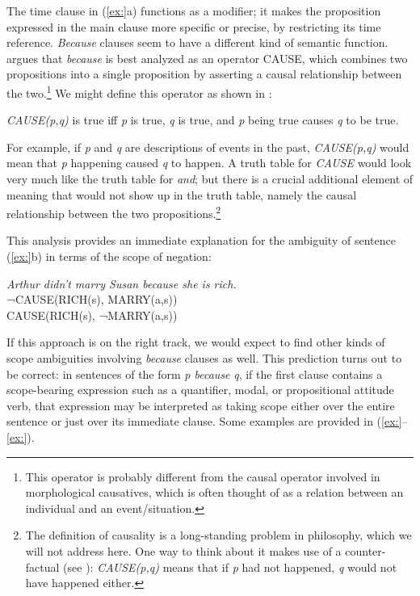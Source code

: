 The time clause in (\ref{ex:}a) functions as a modifier; it makes the proposition expressed in the main clause more specific or precise, by restricting its time reference. \textit{Because} clauses seem to have a different kind of semantic function. \citet{Johnston1994} argues that \textit{because} is best analyzed as an operator CAUSE, which combines two propositions into a single proposition by asserting a causal relationship between the two.\footnote{This operator is probably different from the causal operator involved in morphological causatives, which is often thought of as a relation between an individual and an event/situation.} We might define this operator as shown in :


\begin{stylepoints}
\textit{CAUSE(p,q)} is true iff \textit{p} is true, \textit{q} is true, and \textit{p} being true causes \textit{q} to be true.
\end{stylepoints}


For example, if \textit{p} and \textit{q} are descriptions of events in the past, \textit{CAUSE(p,q)} would mean that \textit{p} happening caused \textit{q} to happen. A truth table for \textit{CAUSE} would look very much like the truth table for \textit{and}; but there is a crucial additional element of meaning that would not show up in the truth table, namely the causal relationship between the two propositions.\footnote{The definition of causality is a long-standing problem in philosophy, which we will not address here. One way to think about it makes use of a counter-factual (see ): \textit{CAUSE(p,q)} means that if \textit{p} had not happened, \textit{q} would not have happened either.}



This analysis provides an immediate explanation for the ambiguity of sentence (\ref{ex:}b) in terms of the scope of negation:


\ea
  \textit{Arthur didn’t marry Susan because she is rich.}\\
\ea ¬CAUSE(RICH(s), MARRY(a,s))\\
\ex CAUSE(RICH(s), ¬MARRY(a,s))
                       \z
\z


If this approach is on the right track, we would expect to find other kinds of scope ambiguities involving \textit{because} clauses as well. This prediction turns out to be correct: in sentences of the form \textit{p because} \textit{q}, if the first clause contains a scope-bearing expression such as a quantifier, modal, or propositional attitude verb, that expression may be interpreted as taking scope either over the entire sentence or just over its immediate clause. Some examples are provided in (\ref{ex:}--\ref{ex:}).


